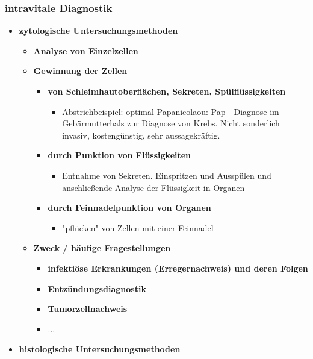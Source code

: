 \subsubsection{intravitale Diagnostik}
	\begin{itemize}
		\item \textbf{zytologische Untersuchungsmethoden}
			\begin{itemize}
				\item \textbf{Analyse von Einzelzellen}
				\item \textbf{Gewinnung der Zellen}
					\begin{itemize}
						\item \textbf{von Schleimhautoberflächen, Sekreten, Spülflüssigkeiten}
							\begin{itemize}
								\item Abstrichbeispiel: optimal Papanicolaou: Pap - Diagnose im Gebärmutterhals zur Diagnose von Krebs. Nicht sonderlich invasiv, kostengünstig, sehr aussagekräftig.
							\end{itemize}
						\item \textbf{durch Punktion von Flüssigkeiten}
							\begin{itemize}
								\item Entnahme von Sekreten. Einspritzen und Ausspülen und anschließende Analyse der Flüssigkeit in Organen
							\end{itemize}
						\item \textbf{durch Feinnadelpunktion von Organen}
							\begin{itemize}
								\item "pflücken" von Zellen mit einer Feinnadel
							\end{itemize}
					\end{itemize}
				\item \textbf{Zweck / häufige Fragestellungen}
					\begin{itemize}
						\item \textbf{infektiöse Erkrankungen (Erregernachweis) und deren Folgen}
						\item \textbf{Entzündungsdiagnostik}
						\item \textbf{Tumorzellnachweis}
						\item \textbf{$\dots$}
					\end{itemize}
			\end{itemize}
\pagebreak
		\item \textbf{histologische Untersuchungsmethoden}
			\begin{itemize}

\end{itemize}
\end{itemize}
